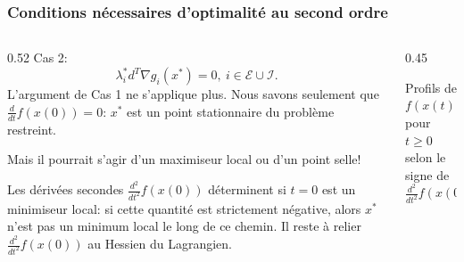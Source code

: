 \documentclass[usepdftitle=false,aspectratio=169]{beamer}
\def\cE{\mathcal{E}}
\def\cI{\mathcal{I}}
\begin{document}
\begin{frame}[shrink=2]
\frametitle{Conditions nécessaires d'optimalité au second ordre}

\begin{columns}[T]
\begin{column}{0.52\textwidth}
Cas 2:
$$
\lambda_i^* d^T \nabla g_i(x^*) = 0,\ i \in \cE \cup \cI.
$$
L'argument de Cas 1 ne s'applique plus.
Nous savons seulement que $\frac{d}{dt} f(x(0)) = 0$: $x^*$ est un point stationnaire du problème restreint.

Mais il pourrait s'agir d'un maximiseur local ou d'un point selle!

Les dérivées secondes $\frac{d^2}{dt^2} f(x(0))$ déterminent si $t=0$ est un minimiseur local: si cette quantité est strictement négative, alors $x^*$ n'est pas un minimum local le long de ce chemin. Il reste à relier $\frac{d^2}{dt^2} f(x(0))$ au Hessien du Lagrangien.
\end{column}
\begin{column}{0.45\textwidth}
\centering
{}

{\small\centering Profils de $f(x(t))$ pour $t \geq 0$\\ selon le signe de $\frac{d^2}{dt^2}f(x(0))$}
\end{column}
\end{columns}

\end{frame}
\end{document}
